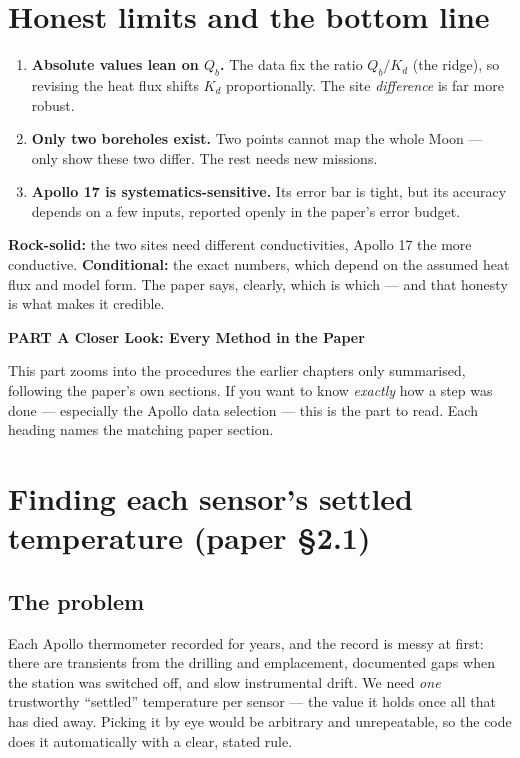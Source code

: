 \documentclass[11pt]{article}
\newcounter{partno}
\newcommand{\partdivider}[1]{%
  \par\addvspace{10pt}\refstepcounter{partno}\FloatBarrier
  \noindent\begin{tcolorbox}[colback=teal!14!white,colframe=teal!50!black,
    boxrule=1pt,arc=2pt,left=10pt,right=10pt,top=5pt,bottom=5pt,
    before skip=4pt,after skip=6pt]
  \centering\large\bfseries\color{teal!40!black}
  PART \Roman{partno}\quad\textbullet\quad #1\end{tcolorbox}\par\addvspace{3pt}}
\renewcommand{\partdivider}[1]{\par\addvspace{10pt}\refstepcounter{partno}%
    \FloatBarrier\noindent\begin{tcolorbox}[colback=gray!15!white,colframe=black,
      boxrule=1pt,arc=2pt,left=10pt,right=10pt,top=5pt,bottom=5pt,
      before skip=4pt,after skip=6pt]\centering\large\bfseries\color{black}
    PART \Roman{partno}\quad\textbullet\quad #1\end{tcolorbox}\par\addvspace{3pt}}
\begin{document}
\section{Honest limits and the bottom line}
\begin{enumerate}
\item \textbf{Absolute values lean on $Q_b$.} The data fix the ratio
      $Q_b/K_d$ (the ridge), so revising the heat flux shifts $K_d$
      proportionally. The site \emph{difference} is far more robust.
\item \textbf{Only two boreholes exist.} Two points cannot map the whole
      Moon --- only show these two differ. The rest needs new missions.
\item \textbf{Apollo 17 is systematics-sensitive.} Its error bar is
      tight, but its accuracy depends on a few inputs, reported openly in
      the paper's error budget.
\end{enumerate}
\begin{keybox}
\textbf{Rock-solid:} the two sites need different conductivities, Apollo
17 the more conductive. \textbf{Conditional:} the exact numbers, which
depend on the assumed heat flux and model form. The paper says, clearly,
which is which --- and that honesty is what makes it credible.
\end{keybox}

\partdivider{A Closer Look: Every Method in the Paper}

This part zooms into the procedures the earlier chapters only summarised,
following the paper's own sections. If you want to know \emph{exactly}
how a step was done --- especially the Apollo data selection --- this is
the part to read. Each heading names the matching paper section.

\section{Finding each sensor's settled temperature (paper \S2.1)}
\label{sec:stability}
\subsection{The problem}
Each Apollo thermometer recorded for years, and the record is messy at
first: there are transients from the drilling and emplacement, documented
gaps when the station was switched off, and slow instrumental drift. We
need \emph{one} trustworthy ``settled'' temperature per sensor --- the
value it holds once all that has died away. Picking it by eye would be
arbitrary and unrepeatable, so the code does it automatically with a
clear, stated rule.
\end{document}
